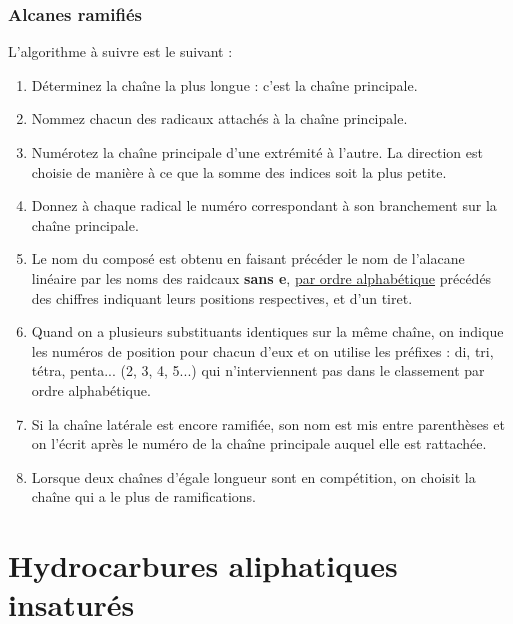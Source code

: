 \documentclass[a4paper, oneside]{book}
\begin{document}
\subsubsection{Alcanes ramifiés}
L'algorithme à suivre est le suivant :
\begin{enumerate}
    \item Déterminez la chaîne la plus longue : c'est la chaîne principale.
    \item Nommez chacun des radicaux attachés à la chaîne principale.
    \item Numérotez la chaîne principale d'une extrémité à l'autre. La direction est choisie de manière à ce que la somme des indices soit la plus petite.
    \item Donnez à chaque radical le numéro correspondant à son branchement sur la chaîne principale.
    \item Le nom du composé est obtenu en faisant précéder le nom de l'alacane linéaire par les noms des raidcaux \textbf{sans e}, \underline{par ordre alphabétique} précédés des chiffres indiquant leurs positions respectives, et d'un tiret.
    \item Quand on a plusieurs substituants identiques sur la même chaîne, on indique les numéros de position pour chacun d'eux et on utilise les préfixes : di, tri, tétra, penta... (2, 3, 4, 5...) qui n'interviennent pas dans le classement par ordre alphabétique.
    \item Si la chaîne latérale est encore ramifiée, son nom est mis entre parenthèses et on l'écrit après le numéro de la chaîne principale auquel elle est rattachée.
    \item Lorsque deux chaînes d'égale longueur sont en compétition, on choisit la chaîne qui a le plus de ramifications.
\end{enumerate}
\section{Hydrocarbures aliphatiques insaturés}
\end{document}

